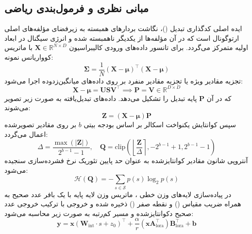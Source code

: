 \subsection{مبانی نظری و فرمول‌بندی ریاضی}
ایده اصلی کدگذاری تبدیل ()، نگاشت بردارهای همبسته به زیرفضای مؤلفه‌های اصلی ارتوگونال است که در آن مؤلفه‌ها از یکدیگر ناهمبسته شده و انرژی سیگنال در ابعاد اولیه متمرکز می‌گردد. برای تانسور داده‌های ورودی کالیبراسیون $\mathbf{X} \in \mathbb{R}^{N \times D}$ با ماتریس کوواریانس نمونه:
\begin{equation}
\mathbf{\Sigma} = \frac{1}{N} (\mathbf{X} - \mathbf{\mu})^\top (\mathbf{X} - \mathbf{\mu})
\end{equation}
تجزیه مقادیر ویژه یا تجزیه مقادیر منفرد بر روی داده‌های میانگین‌زدوده اجرا می‌شود:
\begin{equation}
\mathbf{X} - \mathbf{\mu} = \mathbf{U} \mathbf{S} \mathbf{V}^\top \implies \mathbf{P} = \mathbf{V} \in \mathbb{R}^{D \times D}
\end{equation}
که در آن $\mathbf{P}$ پایه تبدیل  را تشکیل می‌دهد. داده‌های تبدیل‌یافته به صورت زیر تصویر می‌شوند:
\begin{equation}
\mathbf{Z} = (\mathbf{X} - \mathbf{\mu}) \mathbf{P}
\end{equation}
سپس کوانتایش یکنواخت اسکالر بر اساس بودجه بیتی $b$ بر روی مقادیر تصویرشده اعمال می‌گردد:
\begin{equation}
\Delta = \frac{\max(|\mathbf{Z}|)}{2^{b-1} - 1}, \quad \mathbf{Q} = \text{clip}\left( \left\lfloor \frac{\mathbf{Z}}{\Delta} \right\rceil, -2^{b-1}+1, 2^{b-1}-1 \right)
\end{equation}
آنتروپی شانون مقادیر کوانتایزشده به عنوان حد پایین تئوریک نرخ فشرده‌سازی سنجیده می‌شود:
\begin{equation}
\mathcal{H}(\mathbf{Q}) = -\sum_{s \in \mathcal{S}} p(s) \log_2 p(s)
\end{equation}
در پیاده‌سازی لایه‌های وزن خطی ، ماتریس وزن لایه پایه با یک بافر عدد صحیح به همراه ضریب مقیاس () و نقطه صفر () ذخیره شده و خروجی با ترکیب خروجی عدد صحیح دکوانتایزشده و مسیر کم‌رتبه به صورت زیر محاسبه می‌شود:
\begin{equation}
\mathbf{y} = \mathbf{x} \left( \mathbf{W}_{\text{int}} \cdot s + z_0 \right)^\top + \frac{\alpha}{r} (\mathbf{x} \mathbf{A}_{\text{lora}}^\top) \mathbf{B}_{\text{lora}}^\top + \mathbf{b}
\end{equation}

